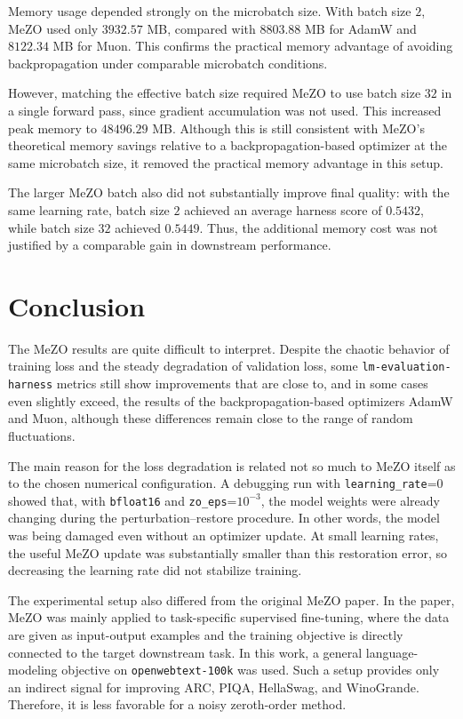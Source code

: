 \documentclass{article}
\begin{document}
Memory usage depended strongly on the microbatch size. With batch size $2$, MeZO used only $3932.57$ MB, compared with $8803.88$ MB for AdamW and $8122.34$ MB for Muon. This confirms the practical memory advantage of avoiding backpropagation under comparable microbatch conditions.

However, matching the effective batch size required MeZO to use batch size $32$ in a single forward pass, since gradient accumulation was not used. This increased peak memory to $48496.29$ MB. Although this is still consistent with MeZO's theoretical memory savings relative to a backpropagation-based optimizer at the same microbatch size, it removed the practical memory advantage in this setup.

The larger MeZO batch also did not substantially improve final quality: with the same learning rate, batch size $2$ achieved an average harness score of $0.5432$, while batch size $32$ achieved $0.5449$. Thus, the additional memory cost was not justified by a comparable gain in downstream performance.

\section{Conclusion}
The MeZO results are quite difficult to interpret. Despite the chaotic behavior of training loss and the steady degradation of validation loss, some \texttt{lm-evaluation-harness} metrics still show improvements that are close to, and in some cases even slightly exceed, the results of the backpropagation-based optimizers AdamW and Muon, although these differences remain close to the range of random fluctuations.

The main reason for the loss degradation is related not so much to MeZO itself as to the chosen numerical configuration. A debugging run with \texttt{learning\_rate}=0 showed that, with \texttt{bfloat16} and \texttt{zo\_eps}=$10^{-3}$, the model weights were already changing during the perturbation--restore procedure. In other words, the model was being damaged even without an optimizer update. At small learning rates, the useful MeZO update was substantially smaller than this restoration error, so decreasing the learning rate did not stabilize training.

The experimental setup also differed from the original MeZO paper. In the paper, MeZO was mainly applied to task-specific supervised fine-tuning, where the data are given as input-output examples and the training objective is directly connected to the target downstream task. In this work, a general language-modeling objective on \texttt{openwebtext-100k} was used. Such a setup provides only an indirect signal for improving ARC, PIQA, HellaSwag, and WinoGrande. Therefore, it is less favorable for a noisy zeroth-order method.
\end{document}

